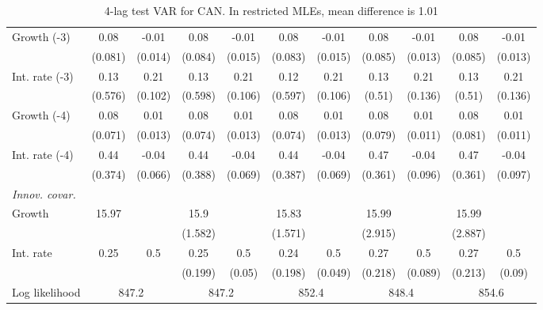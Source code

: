 \begin{table}[htbp]
\begin{tabular}{@{\extracolsep{4pt}}lcccccccccc@{}}
\quad Growth (-3) 	 &0.08 	 & -0.01 	 & 0.08 	 & -0.01 	 & 0.08 	 & -0.01 	 & 0.08 	 & -0.01 	 & 0.08 	 & -0.01	 \\ 
 		 & (0.081) 	 & (0.014) 	 & (0.084) 	 & (0.015) 	 & (0.083) 	 & (0.015) 	 & (0.085) 	 & (0.013) 	 & (0.085) 	 & (0.013) 	 \\ 
\quad Int. rate (-3) 	 &0.13 	 & 0.21 	 & 0.13 	 & 0.21 	 & 0.12 	 & 0.21 	 & 0.13 	 & 0.21 	 & 0.13 	 & 0.21	 \\ 
 		 & (0.576) 	 & (0.102) 	 & (0.598) 	 & (0.106) 	 & (0.597) 	 & (0.106) 	 & (0.51) 	 & (0.136) 	 & (0.51) 	 & (0.136) 	 \\ 
\quad Growth (-4) 	 &0.08 	 & 0.01 	 & 0.08 	 & 0.01 	 & 0.08 	 & 0.01 	 & 0.08 	 & 0.01 	 & 0.08 	 & 0.01	 \\ 
 		 & (0.071) 	 & (0.013) 	 & (0.074) 	 & (0.013) 	 & (0.074) 	 & (0.013) 	 & (0.079) 	 & (0.011) 	 & (0.081) 	 & (0.011) 	 \\ 
\quad Int. rate (-4) 	 &0.44 	 & -0.04 	 & 0.44 	 & -0.04 	 & 0.44 	 & -0.04 	 & 0.47 	 & -0.04 	 & 0.47 	 & -0.04	 \\ 
 		 & (0.374) 	 & (0.066) 	 & (0.388) 	 & (0.069) 	 & (0.387) 	 & (0.069) 	 & (0.361) 	 & (0.096) 	 & (0.361) 	 & (0.097) 	 \\ 
\rule{0pt}{4ex} \emph{Innov. covar.}  	 & 	 & 	 & 	 & 	 & 	 & 	 & 	 & 	 & 	 &\\ 
\quad Growth 	 &15.97 	 &  	 & 15.9 	 &  	 & 15.83 	 &  	 & 15.99 	 &  	 & 15.99 	 & 	 \\ 
 		 &  	 &  	 & (1.582) 	 &  	 & (1.571) 	 &  	 & (2.915) 	 &  	 & (2.887) 	 &  	 \\ 
\quad Int. rate 	 &0.25 	 & 0.5 	 & 0.25 	 & 0.5 	 & 0.24 	 & 0.5 	 & 0.27 	 & 0.5 	 & 0.27 	 & 0.5	 \\ 
 		 &  	 &  	 & (0.199) 	 & (0.05) 	 & (0.198) 	 & (0.049) 	 & (0.218) 	 & (0.089) 	 & (0.213) 	 & (0.09) 	 \\ 
 \hline \rule{0pt}{4ex} 
  Log likelihood 	 &\multicolumn{2}{c}{847.2} 	 & \multicolumn{2}{c}{847.2} 	 & \multicolumn{2}{c}{852.4} 	 & \multicolumn{2}{c}{848.4} 	 & \multicolumn{2}{c}{854.6}\\ 

 \hline 	\end{tabular}		\caption{4-lag test VAR for CAN. In restricted MLEs, mean difference is 1.01}
		\label{tab:CAN4lag}

\end{table}